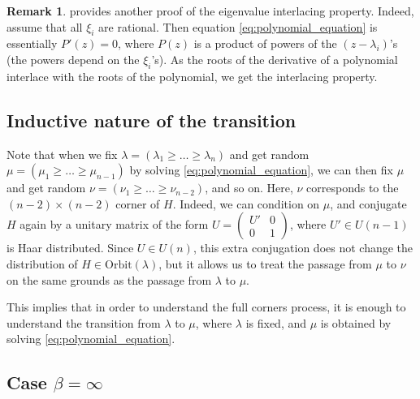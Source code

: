 \documentclass[letterpaper,11pt,oneside,reqno]{article}
\numberwithin{equation}{section}
\theoremstyle{definition}
\newtheorem{remark}[proposition]{Remark}
\begin{document}
\begin{remark}
	provides another proof of the eigenvalue interlacing property.
	Indeed, assume that all $\xi_i$ are rational. Then
	equation
	\eqref{eq:polynomial_equation} is essentially $P'(z)=0$,
	where $P(z)$ is a product of powers of the $(z-\lambda_i)$'s
	(the powers depend on the $\xi_i$'s).
	As the roots of the derivative of a polynomial interlace with the roots of the polynomial,
	we get the interlacing property.
\end{remark}

\subsection{Inductive nature of the transition}

Note that when we fix $\lambda=(\lambda_1\ge \ldots \ge \lambda_n )$
and get random $\mu=(\mu_1\ge \ldots \ge \mu_{n-1} )$ by solving 
\eqref{eq:polynomial_equation}, we can then fix $\mu$ and get random
$\nu=(\nu_1\ge \ldots \ge \nu_{n-2} )$, and so on. 
Here, $\nu$ corresponds to the $(n-2)\times(n-2)$ corner of $H$.
Indeed, we can condition on $\mu$, and conjugate $H$ again by a
unitary matrix of the form $U=\begin{pmatrix}
	U'&0\\0&1
\end{pmatrix}$, where $U'\in U(n-1)$ is Haar distributed.
Since $U\in U(n)$, this extra conjugation does not change the distribution of $H\in \mathrm{Orbit}(\lambda)$,
but it allows us to treat the passage from $\mu$ to $\nu$ on the same grounds as the 
passage from $\lambda$ to $\mu$.

This implies that in order to understand the full corners process, it is enough to understand the transition from $\lambda$ to $\mu$,
where $\lambda$ is fixed, and $\mu$ is obtained by solving \eqref{eq:polynomial_equation}.


\subsection{Case $\beta=\infty$}
\end{document}
